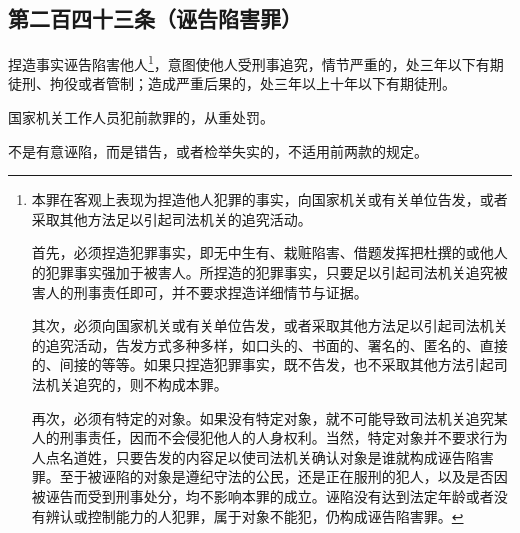 \documentclass[utf-8,10pt]{ctexart}%
\begin{document}
\subsection{第二百四十三条（诬告陷害罪）}
捏造事实诬告陷害他人\footnote{
本罪在客观上表现为捏造他人犯罪的事实，向国家机关或有关单位告发，或者采取其他方法足以引起司法机关的追究活动。

首先，必须捏造犯罪事实，即无中生有、栽赃陷害、借题发挥把杜撰的或他人的犯罪事实强加于被害人。所捏造的犯罪事实，只要足以引起司法机关追究被害人的刑事责任即可，并不要求捏造详细情节与证据。

其次，必须向国家机关或有关单位告发，或者采取其他方法足以引起司法机关的追究活动，告发方式多种多样，如口头的、书面的、署名的、匿名的、直接的、间接的等等。如果只捏造犯罪事实，既不告发，也不采取其他方法引起司法机关追究的，则不构成本罪。

再次，必须有特定的对象。如果没有特定对象，就不可能导致司法机关追究某人的刑事责任，因而不会侵犯他人的人身权利。当然，特定对象并不要求行为人点名道姓，只要告发的内容足以使司法机关确认对象是谁就构成诬告陷害罪。至于被诬陷的对象是遵纪守法的公民，还是正在服刑的犯人，以及是否因被诬告而受到刑事处分，均不影响本罪的成立。诬陷没有达到法定年龄或者没有辨认或控制能力的人犯罪，属于对象不能犯，仍构成诬告陷害罪。
}，意图使他人受刑事追究，情节严重的，处三年以下有期徒刑、拘役或者管制；造成严重后果的，处三年以上十年以下有期徒刑。

国家机关工作人员犯前款罪的，从重处罚。

不是有意诬陷，而是错告，或者检举失实的，不适用前两款的规定。
\end{document}
